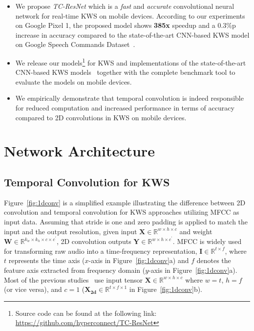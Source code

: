 \documentclass[a4paper]{article}
\begin{document}
\begin{itemize}
    \item We propose \emph{TC-ResNet} which is a \emph{fast} and \emph{accurate} convolutional neural network for real-time KWS on mobile devices. According to our experiments on Google Pixel 1, the proposed model shows \textbf{385x} speedup and a 0.3\%p increase in accuracy compared to the state-of-the-art CNN-based KWS model on Google Speech Commands Dataset~\cite{googlespeechcommandsv1}.
    \item We release our models\footnote{Source code can be found at the following link: \url{https://github.com/hyperconnect/TC-ResNet}} for KWS and implementations of the state-of-the-art CNN-based KWS models~\cite{sainath-interspeech-2015-cnn, zhang-arxiv-2017-helloedge, tang-icassp-2018-residual} together with the complete benchmark tool to evaluate the models on mobile devices.
    \item We empirically demonstrate that temporal convolution is indeed responsible for reduced computation and increased performance in terms of accuracy compared to 2D convolutions in KWS on mobile devices.
\end{itemize}





\section{Network Architecture}\label{section:architecture}

\subsection{Temporal Convolution for KWS}\label{subsection:1dconv}
Figure~\ref{fig:1dconv} is a simplified example illustrating the difference between 2D convolution and temporal convolution for KWS approaches utilizing MFCC as input data.
Assuming that stride is one and zero padding is applied to match the input and the output resolution, given input $\mathbf{X} \in \mathbb{R}^{w \times h \times c}$ and weight $\mathbf{W} \in \mathbb{R}^{k_{w} \times k_{h} \times c \times c^{\prime}}$, 2D convolution outputs $\mathbf{Y} \in \mathbb{R}^{w \times h \times c^{\prime}}$.
MFCC is widely used for transforming raw audio into a time-frequency representation, $\mathbf{I} \in \mathbb{R}^{t \times f}$, where $t$ represents the time axis ($x$-axis in Figure~\ref{fig:1dconv}a) and $f$ denotes the feature axis extracted from frequency domain ($y$-axis in Figure~\ref{fig:1dconv}a).
Most of the previous studies~\cite{zhang-arxiv-2017-helloedge, tang-icassp-2018-residual} use input tensor $\mathbf{X} \in \mathbb{R}^{w \times h \times c}$ where $w = t$, $h = f$ (or vice versa), and $c = 1$ ($\mathbf{X_{2d}} \in \mathbb{R}^{t \times f\times 1}$ in Figure~\ref{fig:1dconv}b).
\end{document}
